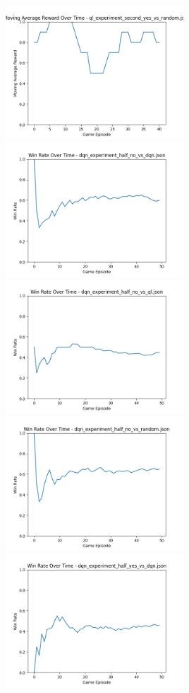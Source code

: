 \includegraphics[width=0.5\textwidth]{images/moving_average_reward_ql_experiment_second_yes_vs_random.png} 
\includegraphics[width=0.5\textwidth]{images/win_rate_dqn_experiment_half_no_vs_dqn.png} 
\includegraphics[width=0.5\textwidth]{images/win_rate_dqn_experiment_half_no_vs_ql.png} 
\includegraphics[width=0.5\textwidth]{images/win_rate_dqn_experiment_half_no_vs_random.png} 
\includegraphics[width=0.5\textwidth]{images/win_rate_dqn_experiment_half_yes_vs_dqn.png} 
